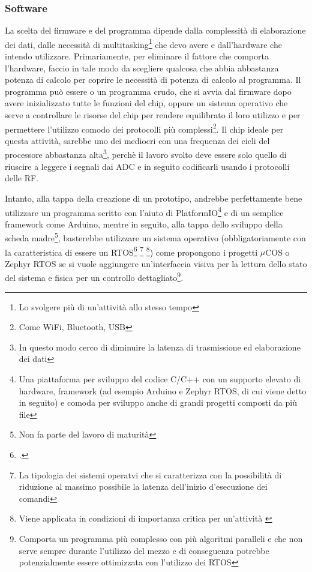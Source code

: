 \documentclass[a4paper, 10pt, final]{article} %
\newcommand{\parenciteit}[2]{\textit{\parencite[#1]{#2}}} %
\begin{document}
    \subsubsection{Software}\label{sec:MotherboardDesignSoftware}
    La scelta del firmware e del programma dipende dalla complessit\`{a} di elaborazione dei dati, dalle necessit\`{a} di multitasking\footnote{Lo svolgere pi\`{u} di un'attivit\`{a} allo stesso tempo} che devo avere e dall'hardware che intendo utilizzare.
    Primariamente, per eliminare il fattore che comporta l'hardware, faccio in tale modo da scegliere qualcosa che abbia abbastanza potenza di calcolo per coprire le necessit\`{a} di potenza di calcolo al programma.
    Il programma pu\`{o} essere o un programma crudo, che si avvia dal firmware dopo avere inizializzato tutte le funzioni del chip, oppure un sistema operativo che serve a controllare le risorse del chip per rendere equilibrato il loro utilizzo e per permettere l'utilizzo comodo dei protocolli pi\`{u} complessi\footnote{Come WiFi, Bluetooth, USB}.
    Il chip ideale per questa attivit\`{a}, sarebbe uno dei mediocri con una frequenza dei cicli del processore abbastanza alta\footnote{In questo modo cerco di diminuire la latenza di trasmissione ed elaborazione dei dati}, perch\`{e} il lavoro svolto deve essere solo quello di riuscire a leggere i segnali dai ADC e in seguito codificarli usando i protocolli delle RF.

    Intanto, alla tappa della creazione di un prototipo, andrebbe perfettamente bene utilizzare un programma scritto con l'aiuto di PlatformIO\footnote{Una piattaforma per sviluppo del codice C/C++ con un supporto elevato di hardware, framework (ad esempio Arduino e Zephyr RTOS, di cui viene detto in seguito) e comoda per sviluppo anche di grandi progetti composti da pi\`{u} file} e di un semplice framework come Arduino, mentre in seguito, alla tappa dello sviluppo della scheda madre\footnote{Non fa parte del lavoro di maturit\`{a}}, basterebbe utilizzare un sistema operativo (obbligatoriamente con la caratteristica di essere un RTOS\footcite[]{RTOS:Wiki} \footnote{La tipologia dei sistemi operatvi che si caratterizza con la possibilit\`{a} di riduzione al massimo possibile la latenza dell'inizio d'esecuzione dei comandi} \footnote{Viene applicata in condizioni di importanza critica per un'attivit\`{a} \parenciteit{}{MissionCritical:Wiki}}) come propongono i progetti $\mu$COS o Zephyr RTOS
    se si vuole aggiungere un'interfaccia visiva per la lettura dello stato del sistema e fisica per un controllo dettagliato\footnote{Comporta un programma pi\`{u} complesso con pi\`{u} algoritmi paralleli e che non serve sempre durante l'utilizzo del mezzo e di conseguenza potrebbe potenzialmente essere ottimizzata con l'utilizzo dei RTOS}.
\end{document}
